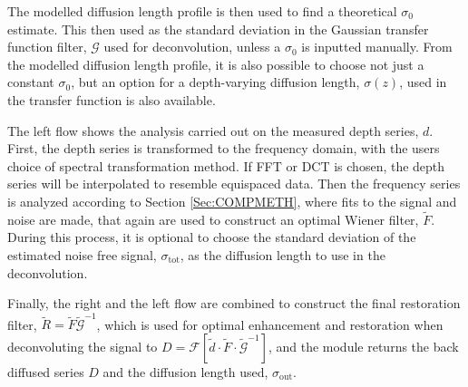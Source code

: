 \documentclass[../../CompleteThesis2/Complete_2ndDraft]{subfiles}
\begin{document}
The modelled diffusion length profile is then used to find a theoretical $\sigma_0$ estimate. This then used as the standard deviation in the Gaussian transfer function filter, $\mathcal{G}$ used for deconvolution, unless a $\sigma_0$ is inputted manually. From the modelled diffusion length profile, it is also possible to choose not just a constant $\sigma_0$, but an option for a depth-varying diffusion length, $\sigma(z)$, used in the transfer function is also available. 

The left flow shows the analysis carried out on the measured depth series, $d$. First, the depth series is transformed to the frequency domain, with the users choice of spectral transformation method. If FFT or DCT is chosen, the depth series will be interpolated to resemble equispaced data. Then the frequency series is analyzed according to Section \ref{Sec:COMPMETH}, where fits to the signal and noise are made, that again are used to construct an optimal Wiener filter, $\tilde{F}$. During this process, it is optional to choose the standard deviation of the estimated noise free signal, $\sigma_{\text{tot}}$, as the diffusion length to use in the deconvolution.

Finally, the right and the left flow are combined to construct the final restoration filter, $\tilde{R}=\tilde{F}\tilde{\mathcal{G}}^{-1}$, which is used for optimal enhancement and restoration when deconvoluting the signal to $D=\mathcal{F}\left[\tilde{d}\cdot\tilde{F}\cdot\tilde{\mathcal{G}}^{-1}\right]$, and the module returns the back diffused series $D$ and the diffusion length used, $\sigma_{\text{out}}$.
\end{document}
